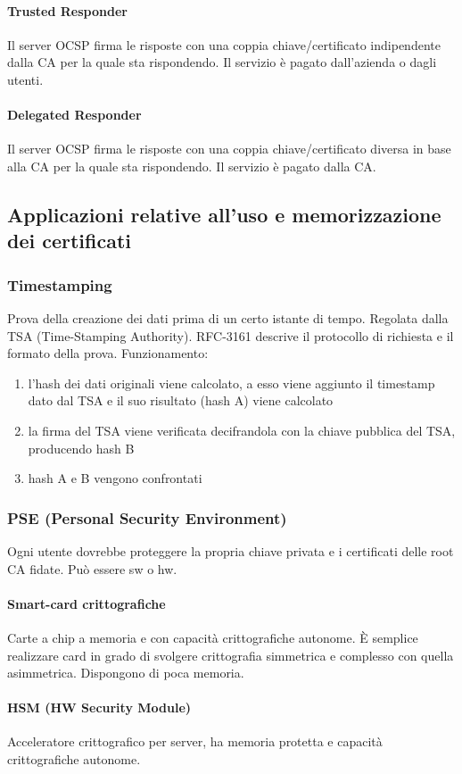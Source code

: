 \documentclass[11pt]{article}
\begin{document}
\paragraph*{Trusted Responder}
Il server OCSP firma le risposte con una coppia chiave/certificato indipendente dalla CA per la quale sta rispondendo. Il 
servizio è pagato dall'azienda o dagli utenti.
\paragraph*{Delegated Responder} 
Il server OCSP firma le risposte con una coppia chiave/certificato diversa in base alla CA per la quale sta rispondendo. Il 
servizio è pagato dalla CA.
\subsection{Applicazioni relative all'uso e memorizzazione dei certificati}
\subsubsection{Timestamping}
Prova della creazione dei dati prima di un certo istante di tempo. Regolata dalla TSA (Time-Stamping Authority). RFC-3161
descrive il protocollo di richiesta e il formato della prova.
Funzionamento:
\begin{enumerate}
    \item l'hash dei dati originali viene calcolato, a esso viene aggiunto il timestamp dato dal TSA e il suo risultato 
    (hash A) viene calcolato
    \item la firma del TSA viene verificata decifrandola con la chiave pubblica del TSA, producendo hash B 
    \item hash A e B vengono confrontati 
\end{enumerate}
\subsubsection{PSE (Personal Security Environment)}
Ogni utente dovrebbe proteggere la propria chiave privata e i certificati delle root CA fidate. Può essere sw o hw.
\paragraph*{Smart-card crittografiche}
Carte a chip a memoria e con capacità crittografiche autonome. È semplice realizzare card in grado di svolgere crittografia 
simmetrica e complesso con quella asimmetrica. Dispongono di poca memoria.
\paragraph*{HSM (HW Security Module)}
Acceleratore crittografico per server, ha memoria protetta e capacità crittografiche autonome.
\end{document}
